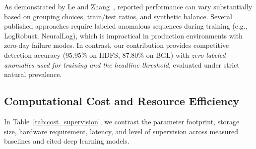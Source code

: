 \documentclass[conference]{IEEEtran}
\begin{document}
As demonstrated by Le and Zhang~\cite{le2022log}, reported performance can vary substantially based on grouping choices, train/test ratios, and synthetic balance. Several published approaches require labeled anomalous sequences during training (e.g., LogRobust, NeuralLog), which is impractical in production environments with zero-day failure modes. In contrast, our contribution provides competitive detection accuracy ($95.95\%$ on HDFS, $87.80\%$ on BGL) with \textit{zero labeled anomalies used for training and the headline threshold}, evaluated under strict natural prevalence.

\subsection{Computational Cost and Resource Efficiency}
In Table~\ref{tab:cost_supervision}, we contrast the parameter footprint, storage size, hardware requirement, latency, and level of supervision across measured baselines and cited deep learning models.

\begin{table}[htbp]
\centering
\caption{Computational Cost and Supervision Requirements}
\label{tab:cost_supervision}
\end{table}
\end{document}
